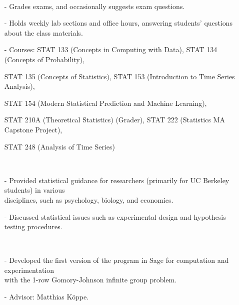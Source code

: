 \documentclass{res}
\begin{document}
\begin{resume}
      \\ 
            \begin{itemize}\setlength\itemsep{0em}
        \item[-] Grades exams, and occasionally suggests exam questions. 
        \item[-] Holds weekly lab sections and office hours, answering students' questions about the class materials.
        \item[-] Courses: STAT 133 (Concepts in Computing with Data), STAT 134 (Concepts of Probability), 
        \item[] STAT 135 (Concepts of Statistics), 
        STAT 153 (Introduction to Time Series Analysis), 
        \item[] STAT 154 (Modern Statistical Prediction and Machine Learning), 
        \item[] STAT 210A (Theoretical Statistics) (Grader), 
         STAT 222 (Statistics MA Capstone Project),
         \item[] STAT 248 (Analysis of Time Series)
        \end{itemize}
  
     
     \\ 
    \begin{itemize}
     \item[-] Provided statistical guidance for researchers (primarily for UC Berkeley students) in various \\disciplines, such as psychology, biology, and economics.
     \item[-] Discussed statistical issues such as experimental design and hypothesis testing procedures.    
    \end{itemize}        
    
     \\ 
        \begin{itemize}
        \item[-] Developed the first version of the program in Sage for computation and experimentation
       \\with the 1-row Gomory-Johnson infinite group problem.
       \item[-] Advisor: Matthias K\"{o}ppe.
        \end{itemize}
%    


\end{resume}
\end{document}

